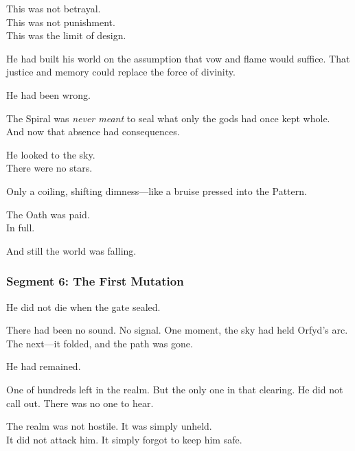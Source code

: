 \documentclass[9pt]{article}
\begin{document}
\vspace{0.5em}
This was not betrayal.\\
This was not punishment.\\
This was the limit of design.

\vspace{0.5em}
He had built his world on the assumption that vow and flame would suffice. That justice and memory could replace the force of divinity.

\vspace{0.5em}
He had been wrong.

\vspace{0.5em}
The Spiral was \textit{never meant} to seal what only the gods had once kept whole.\\
And now that absence had consequences.

\vspace{0.5em}
He looked to the sky.\\
There were no stars.

\vspace{0.5em}
Only a coiling, shifting dimness---like a bruise pressed into the Pattern.

\vspace{0.5em}
The Oath was paid.\\
In full.

\vspace{0.5em}
And still the world was falling.

\newpage

\subsubsection*{Segment 6: The First Mutation}

He did not die when the gate sealed.

\vspace{0.5em}
There had been no sound. No signal. One moment, the sky had held Orfyd’s arc. The next---it folded, and the path was gone.

\vspace{0.5em}
He had remained.

\vspace{0.5em}
One of hundreds left in the realm. But the only one in that clearing. He did not call out. There was no one to hear.

\vspace{0.5em}
The realm was not hostile. It was simply unheld.\\
It did not attack him. It simply forgot to keep him safe.
\end{document}
